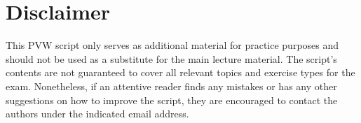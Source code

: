 \documentclass[main]{subfiles}
\begin{document}
\section*{Disclaimer}

This PVW script only serves as additional material for practice purposes and should not be used as a substitute for the main lecture material. The script's contents are not guaranteed to cover all relevant topics and exercise types for the exam. Nonetheless, if an attentive reader finds any mistakes or has any other suggestions on how to improve the script, they are encouraged to contact the authors under the indicated email address.
\end{document}

